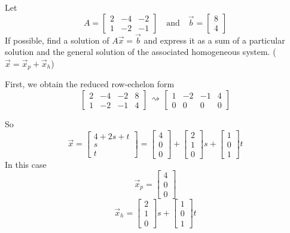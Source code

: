 \documentclass{ximera}
\begin{document}
\begin{example}\label{ex:sumofhomandpart}
Let $$A=\begin{bmatrix}2&-4&-2\\1&-2&-1\end{bmatrix}\quad\text{and}\quad \vec{b}=\begin{bmatrix}8\\4\end{bmatrix}$$
If possible, find a solution of $A\vec{x}=\vec{b}$ and express it as a sum of a particular solution and the general solution of the associated homogeneous system. ($\vec{x}=\vec{x}_p+\vec{x}_h$)
\begin{explanation}
First, we obtain the reduced row-echelon form
$$\left[\begin{array}{ccc|c}  
 2&-4&-2&8\\1&-2&-1&4
 \end{array}\right]\begin{array}{c}
 \\
 \rightsquigarrow\\
 \\
 \end{array}\left[\begin{array}{ccc|c}  
 1&-2&-1&4\\0&0&0&0
 \end{array}\right]$$
 
 So $$\vec{x}=\begin{bmatrix}4+2s+t\\s\\t\end{bmatrix}=\begin{bmatrix}4\\0\\0\end{bmatrix}+\begin{bmatrix}2\\1\\0\end{bmatrix}s+\begin{bmatrix}1\\0\\1\end{bmatrix}t$$
 In this case $$\vec{x}_p=\begin{bmatrix}4\\0\\0\end{bmatrix}$$
 $$\vec{x}_h=\begin{bmatrix}2\\1\\0\end{bmatrix}s+\begin{bmatrix}1\\0\\1\end{bmatrix}t$$
\end{explanation}
\end{example}
\end{document}
